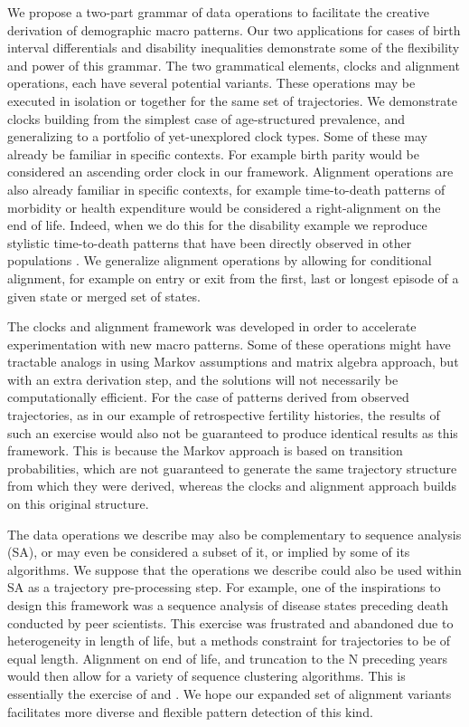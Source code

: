 \documentclass{article}
\begin{document}
We propose a two-part grammar of data operations to facilitate the creative derivation of demographic macro patterns. Our two applications for cases of birth interval differentials and disability inequalities demonstrate some of the flexibility and power of this grammar. The two grammatical elements, clocks and alignment operations, each have several potential variants. These operations may be executed in isolation or together for the same set of trajectories. We demonstrate clocks building from the simplest case of age-structured prevalence, and generalizing to a portfolio of yet-unexplored clock types. Some of these may already be familiar in specific contexts. For example birth parity would be considered an ascending order clock in our framework. Alignment operations are also already familiar in specific contexts, for example time-to-death patterns of morbidity or health expenditure would be considered a right-alignment on the end of life. Indeed, when we do this for the disability example we reproduce stylistic time-to-death patterns that have been directly observed in other populations \citep{klijs2010disability, riffe2016time}. We generalize alignment operations by allowing for conditional alignment, for example on entry or exit from the first, last or longest episode of a given state or merged set of states.

The clocks and alignment framework was developed in order to accelerate experimentation with new macro patterns. Some of these operations might have tractable analogs in using Markov assumptions and matrix algebra approach, but with an extra derivation step, and the solutions will not necessarily be computationally efficient. For the case of patterns derived from observed trajectories, as in our example of retrospective fertility histories, the results of such an exercise would also not be guaranteed to produce identical results as this framework. This is because the Markov approach is based on transition probabilities, which are not guaranteed to generate the same trajectory structure from which they were derived, whereas the clocks and alignment approach builds on this original structure. 

The data operations we describe may also be complementary to sequence analysis (SA), or may even be considered a subset of it, or implied by some of its algorithms. We suppose that the operations we describe could also be used within SA as a trajectory pre-processing step. For example, one of the inspirations to design this framework was a sequence analysis of disease states preceding death conducted by peer scientists. This exercise was frustrated and abandoned due to heterogeneity in length of life, but a methods constraint for trajectories to be of equal length. Alignment on end of life, and truncation to the N preceding years would then allow for a variety of sequence clustering algorithms. This is essentially the exercise of \citet{potente2018disability} and \citet{raab2018pathways}. We hope our expanded set of alignment variants facilitates more diverse and flexible pattern detection of this kind.
\end{document}

